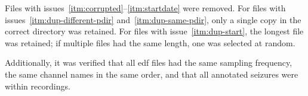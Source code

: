 Files with issues~\ref{itm:corrupted}--\ref{itm:startdate} were removed.
For files with issues~\ref{itm:dup-different-pdir} and~\ref{itm:dup-same-pdir}, only a single copy in the correct directory was retained.
For files with issue~\ref{itm:dup-start}, the longest file was retained; if multiple files had the same length, one was selected at random.

Additionally, it was verified that all \gls{edf} files had the same sampling frequency, the same channel names in the same order, and that all annotated seizures were within recordings.

